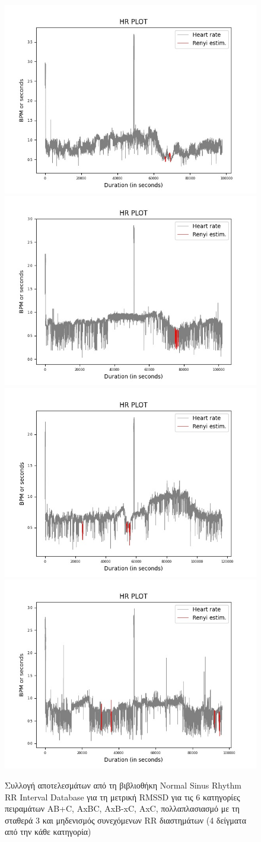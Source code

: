 \begin{figure}[h!]
    \\[\smallskipamount]
    \includegraphics[width=.24\textwidth]{Renyi-nsr/multiply/normal-sinus-rhythm-rr-interval-database-1.0.0_325_nsr004_300sec .jpeg}\hfill
    \includegraphics[width=.24\textwidth]{Renyi-nsr/multiply/normal-sinus-rhythm-rr-interval-database-1.0.0_339_nsr015_300sec .jpeg}\hfill
    \includegraphics[width=.24\textwidth]{Renyi-nsr/multiply/normal-sinus-rhythm-rr-interval-database-1.0.0_388_nsr026_300sec .jpeg}\hfill
    \includegraphics[width=.24\textwidth]{Renyi-nsr/multiply/normal-sinus-rhythm-rr-interval-database-1.0.0_399_nsr016_240sec .jpeg}\hfill
    \\[\smallskipamount]
    \caption{Συλλογή αποτελεσμάτων από τη βιβλιοθήκη \en Normal Sinus Rhythm RR Interval Database \gr για τη μετρική \en RMSSD \gr για τις 6 κατηγορίες πειραμάτων \en AB+C, AxBC, AxB-xC, AxC, \gr πολλαπλασιασμό με τη σταθερά 3 και μηδενισμός συνεχόμενων \en RR \gr διαστημάτων (4 δείγματα από την κάθε κατηγορία)}
\end{figure}

